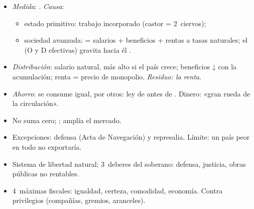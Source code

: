 \documentclass{article}
\begin{document}
\begin{columnas}
\begin{itemize}
\item \emph{Medida}: . \emph{Causa}:
  \begin{itemize}
  \item estado primitivo: trabajo incorporado (castor = 2~ciervos);
  \item sociedad avanzada:  = salarios + beneficios + rentas a tasas naturales; el  (O y D efectivas) gravita hacia él .
  \end{itemize}
\item \emph{Distribución}: salario natural, más alto si el país crece; beneficios ↓ con la acumulación; renta = precio de monopolio. \emph{Residuo: la renta}.
\item \emph{Ahorro}: se consume igual, por otros: ley de  antes de . Dinero: «gran rueda de la circulación».
\end{itemize}
\begin{itemize}
\item No suma cero;  ; amplía el mercado.
\item Excepciones: defensa (Acta de Navegación) y represalia. Límite: un país peor en todo no exportaría.
\end{itemize}
\begin{itemize}
\item Sistema de libertad natural; 3~deberes del soberano: defensa, justicia, obras públicas no rentables.
\item 4~máximas fiscales: igualdad, certeza, comodidad, economía. Contra privilegios (compañías, gremios, aranceles).
\end{itemize}


\end{columnas}
\end{document}
